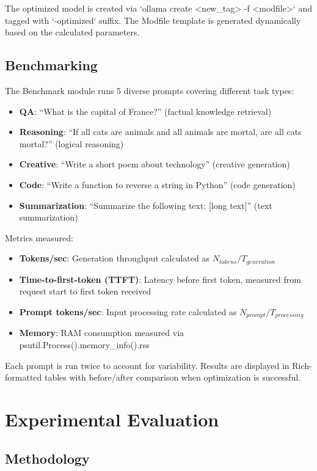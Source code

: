 \documentclass[journal]{IEEEtran}
\begin{document}
The optimized model is created via `ollama create <new_tag> -f <modfile>` and tagged with `-optimized` suffix. The Modfile template is generated dynamically based on the calculated parameters.

\subsection{Benchmarking}

The Benchmark module runs 5 diverse prompts covering different task types:
\begin{itemize}
    \item \textbf{QA}: ``What is the capital of France?'' (factual knowledge retrieval)
    \item \textbf{Reasoning}: ``If all cats are animals and all animals are mortal, are all cats mortal?'' (logical reasoning)
    \item \textbf{Creative}: ``Write a short poem about technology'' (creative generation)
    \item \textbf{Code}: ``Write a function to reverse a string in Python'' (code generation)
    \item \textbf{Summarization}: ``Summarize the following text: [long text]'' (text summarization)
\end{itemize}

Metrics measured:
\begin{itemize}
    \item \textbf{Tokens/sec}: Generation throughput calculated as $N_{tokens} / T_{generation}$
    \item \textbf{Time-to-first-token (TTFT)}: Latency before first token, measured from request start to first token received
    \item \textbf{Prompt tokens/sec}: Input processing rate calculated as $N_{prompt} / T_{processing}$
    \item \textbf{Memory}: RAM consumption measured via psutil.Process().memory\_info().rss
\end{itemize}

Each prompt is run twice to account for variability. Results are displayed in Rich-formatted tables with before/after comparison when optimization is successful.

\section{Experimental Evaluation}

\subsection{Methodology}
\end{document}
